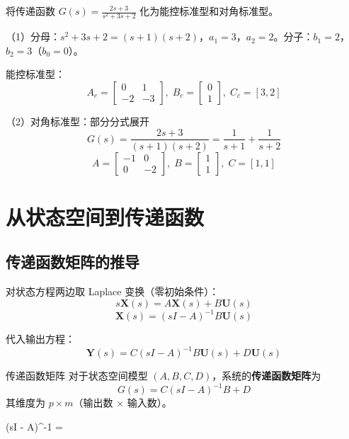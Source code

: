 \begin{example}
将传递函数 $G(s) = \frac{2s+3}{s^2+3s+2}$ 化为能控标准型和对角标准型。

（1）分母：$s^2+3s+2 = (s+1)(s+2)$，$a_1=3$，$a_2=2$。分子：$b_1=2$，$b_2=3$（$b_0=0$）。

能控标准型：
\[
A_c = \begin{bmatrix} 0 & 1 \\ -2 & -3 \end{bmatrix},\;
B_c = \begin{bmatrix} 0 \\ 1 \end{bmatrix},\;
C_c = [3, 2]
\]

（2）对角标准型：部分分式展开
\[
G(s) = \frac{2s+3}{(s+1)(s+2)} = \frac{1}{s+1} + \frac{1}{s+2}
\]
\[
A = \begin{bmatrix} -1 & 0 \\ 0 & -2 \end{bmatrix},\;
B = \begin{bmatrix} 1 \\ 1 \end{bmatrix},\;
C = [1, 1]
\]
\end{example}

\section{从状态空间到传递函数}

\subsection{传递函数矩阵的推导}

对状态方程两边取 Laplace 变换（零初始条件）：
\[
s\mathbf{X}(s) = A\mathbf{X}(s) + B\mathbf{U}(s)
\]
\[
\mathbf{X}(s) = (sI - A)^{-1} B\mathbf{U}(s)
\]

代入输出方程：
\[
\mathbf{Y}(s) = C(sI - A)^{-1} B\mathbf{U}(s) + D\mathbf{U}(s)
\]

\begin{myTheorem}{传递函数矩阵}
对于状态空间模型 $(A,B,C,D)$，系统的\textbf{传递函数矩阵}为
\[
G(s) = C(sI - A)^{-1} B + D
\]
其维度为 $p \times m$（输出数 $\times$ 输入数）。
\end{myTheorem}

\begin{myformula}
(sI - A)^{-1} = 
\end{myformula}

